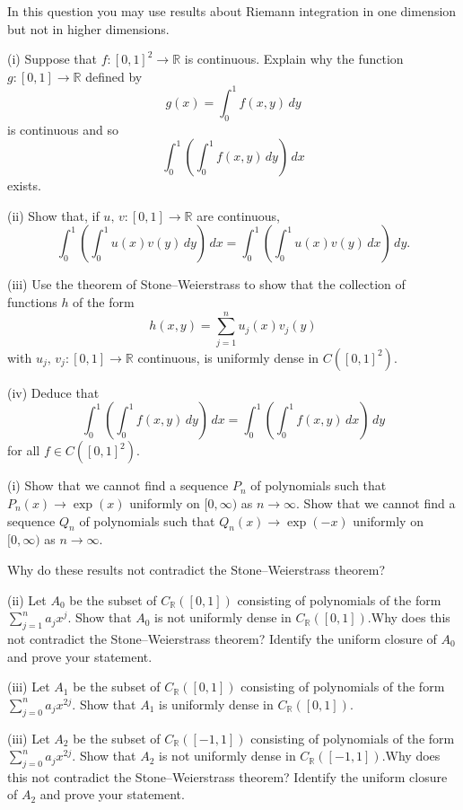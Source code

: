 \begin{exercise}\label{E;Fubini}\label{C2.3} In this question
you may use results about Riemann integration in
one dimension but not in higher dimensions.

(i) Suppose that $f:[0,1]^{2}\rightarrow{\mathbb R}$
is continuous. Explain why the function
$g:[0,1]\rightarrow{\mathbb R}$ defined by
\[g(x)=\int_{0}^{1}f(x,y)\,dy\]
is continuous and so
\[\int_{0}^{1}\left(\int_{0}^{1}f(x,y)\,dy\right)\,dx\]
exists.

(ii) Show that, if $u,\,v:[0,1]\rightarrow{\mathbb R}$
are continuous,
\[\int_{0}^{1}\left(\int_{0}^{1}u(x)v(y)\,dy\right)\,dx
=\int_{0}^{1}\left(\int_{0}^{1}u(x)v(y)\,dx\right)\,dy.\]

(iii) Use the theorem of Stone--Weierstrass to show that the
collection of functions $h$ of the form
\[h(x,y)=\sum_{j=1}^{n}u_{j}(x)v_{j}(y)\]
with $u_{j},\,v_{j}:[0,1]\rightarrow{\mathbb R}$
continuous, is uniformly dense in $C([0,1]^{2})$.

(iv) Deduce that
\[\int_{0}^{1}\left(\int_{0}^{1}f(x,y)\,dy\right)\,dx
=\int_{0}^{1}\left(\int_{0}^{1}f(x,y)\,dx\right)\,dy\]
for all $f\in C([0,1]^{2})$.
\end{exercise}
\begin{exercise}\label{C2.4} 
(i) Show that we cannot find
a sequence $P_{n}$ of polynomials such that
$P_{n}(x)\rightarrow \exp(x)$ uniformly on $[0,\infty)$
as $n\rightarrow\infty$. 
Show that we cannot find
a sequence $Q_{n}$ of polynomials such that
$Q_{n}(x)\rightarrow \exp(-x)$ uniformly on $[0,\infty)$
as $n\rightarrow\infty$.

Why do these results not
contradict the Stone--Weierstrass theorem?

(ii) Let $A_{0}$ be the subset of $C_{\mathbb R}([0,1])$
consisting of polynomials of the form 
$\sum_{j=1}^{n}a_{j}x^{j}$. Show that $A_{0}$ is not
uniformly dense in $C_{\mathbb R}([0,1])$.Why does this not
contradict the Stone--Weierstrass theorem?
Identify the uniform closure of $A_{0}$
and prove your statement.

(iii) Let $A_{1}$ be the subset of $C_{\mathbb R}([0,1])$
consisting of polynomials of the form
$\sum_{j=0}^{n}a_{j}x^{2j}$. Show that $A_{1}$ is
uniformly dense in $C_{\mathbb R}([0,1])$.

(iii) Let $A_{2}$ be the subset of $C_{\mathbb R}([-1,1])$
consisting of polynomials of the form 
$\sum_{j=0}^{n}a_{j}x^{2j}$. Show that $A_{2}$ is not
uniformly dense in $C_{\mathbb R}([-1,1])$.Why does this not
contradict the Stone--Weierstrass theorem?
Identify the uniform closure of $A_{2}$
and prove your statement.
\end{exercise}
